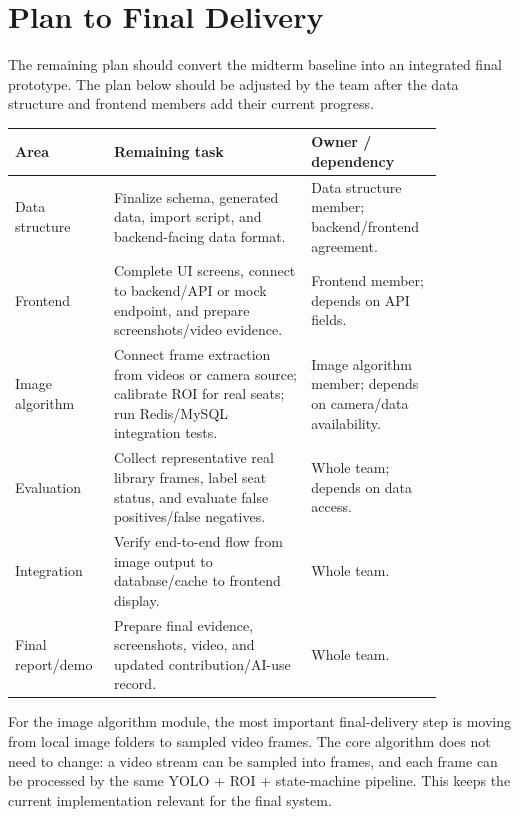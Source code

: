 \section{Plan to Final Delivery}

The remaining plan should convert the midterm baseline into an integrated final prototype. The plan below should be adjusted by the team after the data structure and frontend members add their current progress.

\begin{longtable}{|p{0.18\linewidth}|p{0.42\linewidth}|p{0.25\linewidth}|}
\hline
\textbf{Area} & \textbf{Remaining task} & \textbf{Owner / dependency} \\
\hline
Data structure & Finalize schema, generated data, import script, and backend-facing data format. & Data structure member; backend/frontend agreement. \\
\hline
Frontend & Complete UI screens, connect to backend/API or mock endpoint, and prepare screenshots/video evidence. & Frontend member; depends on API fields. \\
\hline
Image algorithm & Connect frame extraction from videos or camera source; calibrate ROI for real seats; run Redis/MySQL integration tests. & Image algorithm member; depends on camera/data availability. \\
\hline
Evaluation & Collect representative real library frames, label seat status, and evaluate false positives/false negatives. & Whole team; depends on data access. \\
\hline
Integration & Verify end-to-end flow from image output to database/cache to frontend display. & Whole team. \\
\hline
Final report/demo & Prepare final evidence, screenshots, video, and updated contribution/AI-use record. & Whole team. \\
\hline
\end{longtable}

For the image algorithm module, the most important final-delivery step is moving from local image folders to sampled video frames. The core algorithm does not need to change: a video stream can be sampled into frames, and each frame can be processed by the same YOLO + ROI + state-machine pipeline. This keeps the current implementation relevant for the final system.

